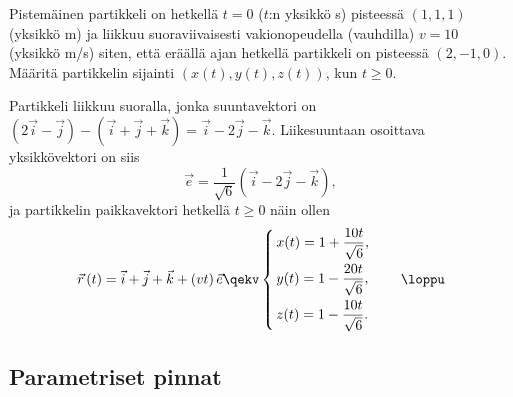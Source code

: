 \begin{Exa} Pistemäinen partikkeli on hetkellä $t=0$ ($t$:n yksikkö s) pisteessä $(1,1,1)$ 
(yksikkö m) ja liikkuu suoraviivaisesti vakionopeudella (vauhdilla) $v=10$ (yksikkö m/s)
siten, että eräällä ajan hetkellä partikkeli on pisteessä $(2,-1,0)$. Määritä partikkelin
sijainti $(x(t),y(t),z(t))$, kun $t \ge 0$. 
\end{Exa}
\ratk Partikkeli liikkuu suoralla, jonka suuntavektori on 
$(2\vec{i}-\vec{j})-(\vec{i}+\vec{j}+\vec{k})=\vec{i}-2\vec{j}-\vec{k}$. Liikesuuntaan
osoittava yksikkövektori on siis
\[ 
\vec{e} = \dfrac{1}{\sqrt{6}}(\vec{i}-2\vec{j}-\vec{k}),
\]
ja partikkelin paikkavektori hetkellä $t \ge 0$ näin ollen
\[
\vec{r}\,(t) = \vec{i}+\vec{j}+\vec{k} + (vt)\,\vec{e} \qekv
               \begin{cases} 
                \,x(t) = 1 + \dfrac{10t}{\sqrt{6}}, \\[3mm] 
                \,y(t) = 1 - \dfrac{20t}{\sqrt{6}}, \\[3mm] 
                \,z(t) = 1 - \dfrac{10t}{\sqrt{6}}.
               \end{cases} \quad\loppu
\]

\subsection*{Parametriset pinnat}

